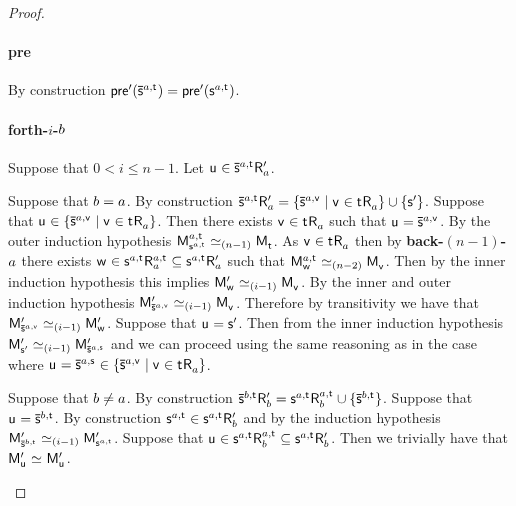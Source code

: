 \begin{proof}
\begin{enumerate}
        \paragraph{pre} By construction $\aPreconditionP(\aPStateS[\agentA,\aStateT]) = \aPreconditionP(\aStateS[\agentA,\aStateT])$.

        \paragraph{forth-$i$-$b$} Suppose that $0 < i \leq n - 1$. Let $\aStateU \in \aPStateS[\agentA,\aStateT] \aAccessibilityP{\agentA}$. 

        Suppose that $b = a$.
        By construction $\aPStateS[\agentA,\aStateT] \aAccessibilityP{\agentA} = \{\aPStateS[\agentA,\aStateV] \mid \aStateV \in \aStateT \aAccessibility{\agentA}\} \cup \{\aStateSP\}$. 
        Suppose that $\aStateU \in \{\aPStateS[\agentA,\aStateV] \mid \aStateV \in \aStateT \aAccessibility{\agentA}\}$.
        Then there exists $\aStateV \in \aStateT \aAccessibility{\agentA}$ such that $\aStateU = \aPStateS[\agentA,\aStateV]$.
        By the outer induction hypothesis $\aPModel[\agentA,\aStateT]{\aStateS[\agentA,\aStateT]} \bisimilar[(n - 1)] \aPModel{\aStateT}$.
        As $\aStateV \in \aStateT \aAccessibility{\agentA}$ then by {\bf back-$(n-1)$-$a$} there exists $\aStateW \in \aStateS[\agentA,\aStateT] \aAccessibility[\agentA,\aStateT]{\agentA} \subseteq \aStateS[\agentA,\aStateT] \aAccessibilityP{\agentA}$ such that $\aPModel[\agentA,\aStateT]{\aStateW} \bisimilar[(n - 2)] \aPModel{\aStateV}$.
        Then by the inner induction hypothesis this implies $\aPModelP{\aStateW} \bisimilar[(i - 1)] \aPModel{\aStateV}$.
        By the inner and outer induction hypothesis $\aPModelP{\aPStateS[\agentA,\aStateV]} \bisimilar[(i - 1)] \aPModel{\aStateV}$.
        Therefore by transitivity we have that $\aPModelP{\aPStateS[\agentA,\aStateV]} \bisimilar[(i - 1)] \aPModelP{\aStateW}$.
        Suppose that $\aStateU = \aStateSP$. 
        Then from the inner induction hypothesis $\aPModelP{\aStateSP} \bisimilar[(i - 1)] \aPModelP{\aPStateS[\agentA,\aStateS]}$ and we can proceed using the same reasoning as in the case where $\aStateU = \aPStateS[\agentA,\aStateS] \in \{\aPStateS[\agentA,\aStateV] \mid \aStateV \in \aStateT \aAccessibility{\agentA}\}$.

        Suppose that $b \neq a$.
        By construction $\aPStateS[\agentB,\aStateT] \aAccessibilityP{\agentB} = \aStateS[\agentA,\aStateT] \aAccessibility[\agentA,\aStateT]{\agentB} \cup \{\aPStateS[\agentB,\aStateT]\}$. 
        Suppose that $\aStateU = \aPStateS[\agentB,\aStateT]$.
        By construction $\aStateS[\agentA,\aStateT] \in \aStateS[\agentA,\aStateT] \aAccessibilityP{\agentB}$ and by the induction hypothesis $\aPModelP{\aPStateS[\agentB,\aStateT]} \bisimilar[(i - 1)] \aPModelP{\aStateS[\agentA,\aStateT]}$.
        Suppose that $\aStateU \in \aStateS[\agentA,\aStateT] \aAccessibility[\agentA,\aStateT]{\agentB} \subseteq \aStateS[\agentA,\aStateT] \aAccessibilityP{\agentB}$.
        Then we trivially have that $\aPModelP{\aStateU} \bisimilar \aPModelP{\aStateU}$.


\end{enumerate}
\end{proof}
